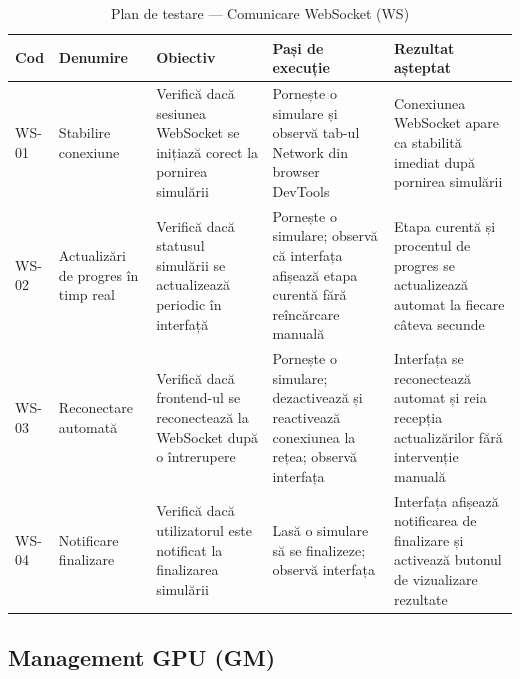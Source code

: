 \documentclass[../../main.tex]{subfiles}
\begin{document}
    \begin{table}[H]
        \centering
        \footnotesize
        \begin{tabular}{|p{}|p{}|p{}|p{}|p{}|}
            \hline
            \textbf{Cod} & \textbf{Denumire} & \textbf{Obiectiv} & \textbf{Pași de execuție} & \textbf{Rezultat așteptat} \\
            \hline
            WS-01 & Stabilire conexiune & Verifică dacă sesiunea WebSocket se inițiază corect la pornirea simulării & Pornește o simulare și observă tab-ul Network din browser DevTools & Conexiunea WebSocket apare ca stabilită imediat după pornirea simulării \\
            \hline
            WS-02 & Actualizări de progres în timp real & Verifică dacă statusul simulării se actualizează periodic în interfață & Pornește o simulare; observă că interfața afișează etapa curentă fără reîncărcare manuală & Etapa curentă și procentul de progres se actualizează automat la fiecare câteva secunde \\
            \hline
            WS-03 & Reconectare automată & Verifică dacă frontend-ul se reconectează la WebSocket după o întrerupere & Pornește o simulare; dezactivează și reactivează conexiunea la rețea; observă interfața & Interfața se reconectează automat și reia recepția actualizărilor fără intervenție manuală \\
            \hline
            WS-04 & Notificare finalizare & Verifică dacă utilizatorul este notificat la finalizarea simulării & Lasă o simulare să se finalizeze; observă interfața & Interfața afișează notificarea de finalizare și activează butonul de vizualizare rezultate \\
            \hline
        \end{tabular}
        \caption{Plan de testare --- Comunicare WebSocket (WS)}
        \label{tab:test_ws}
    \end{table}

    \subsection{Management GPU (GM)}
\end{document}
